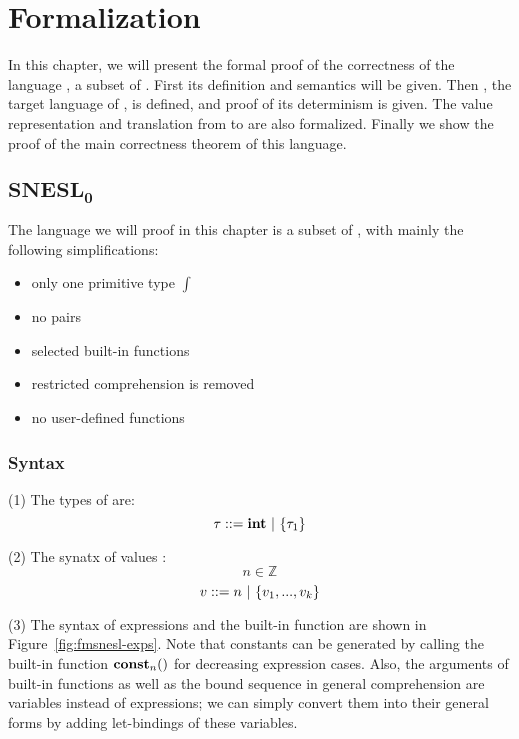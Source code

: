 
\chapter{Formalization}

\def\wf#1{\Vdash #1}

\def\PRName#1{\textsc{I-#1}}
\def\MI{\mathcal{I}}  %



In this chapter, we will present the formal proof of the correctness of the language \fmsnesl, a subset of \mysnesl.
First its definition and semantics will be given.
Then \fmsvcode, the target language of \fmsnesl, is defined, and proof of its determinism is given.
The value representation and translation from \fmsnesl to \fmsvcode are also formalized.
Finally we show the proof of the main correctness theorem of this language.

\section{$\mathbf{SNESL_0}$}

The language \fmsnesl we will proof in this chapter is a subset of \mysnesl, with mainly the following simplifications:
\begin{itemize}
	\item only one primitive type $\int$ 
	\item no pairs
	\item selected built-in functions 
	\item restricted comprehension is removed
	\item no user-defined functions
\end{itemize}


\subsection{Syntax}

\noindent (1) The types of \fmsnesl are: 
$$\tau ::= \mathbf{int} \ | \ \{\tau_1\}$$

\noindent (2) The synatx of \fmsnesl values : 
$$ n \in \mathbb{Z} $$
$$ v::= n \ | \ \{ v_1,...,v_k \}$$

\noindent (3) The syntax of \fmsnesl expressions and the built-in function are shown in Figure~\ref{fig:fmsnesl-exps}. 
Note that constants can be generated by calling the built-in function $\mathbf{const}_{n}()$ for decreasing expression cases.
Also, the arguments of built-in functions as well as the bound sequence in general comprehension are variables instead of expressions; we can simply convert them into their general forms by adding let-bindings of these variables. 

